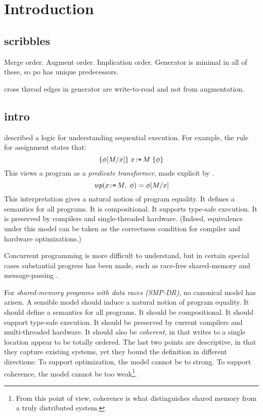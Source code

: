 
\section{Introduction}

\subsection{scribbles}
Merge order.
Augment order.
Implication order.
Generator is minimal in all of these, so po has unique predecessors.

cross thread edges in generator are write-to-read and not from augmentation.

\subsection{intro}

\citet{Hoare:1969:ABC:363235.363259} described a logic for understanding
sequential execution.  For example, the rule for assignment states that:
\begin{displaymath}
  \{\phi[M/x]\}\;x\texttt{:}\mkern-1mu\texttt{=}\,M\;\{\phi\}
\end{displaymath}
This views a program as a \emph{predicate transformer}, made explicit by
\citet{Dijkstra:1975:GCN:360933.360975}.
\begin{displaymath}
  \textit{wp}(x\texttt{:}\mkern-1mu\texttt{=}\,M,\;\phi) = \phi[M/x]
\end{displaymath}
This interpretation gives a natural notion of program equality.  It defines a
semantics for all programs.  It is compositional.  It supports type-safe
execution.  It is preserved by compilers and single-threaded hardware.
(Indeed, equivalence under this model can be taken as the correctness
condition for compiler and hardware optimizations.)


Concurrent programming is more difficult to understand, but in certain
special cases substantial progress has been made, such as race-free
shared-memory
\citep{OHearn:2007:RCL:1235896.1236121,OHearn:2019:SL:3310134.3211968} and
message-passing \citep{Hennessy:1980:ONC:646234.758793,Cleaveland2018}.

For \emph{shared-memory programs with data races (SMP-DR)}, no canonical
model has arisen.  A sensible model should induce a natural notion of program
equality.  It should define a semantics for all programs.  It should be
compositional.  It should support type-safe execution.  It should be
preserved by current compilers and multi-threaded hardware.  It should also be
\emph{coherent}, in that writes to a single location appear to be totally
ordered.  The last two points are descriptive, in that they capture existing
systems, yet they bound the definition in different directions: To support
optimization, the model cannot be to strong.  To support coherence, the model
cannot be too weak\footnote{From this point of view, coherence is what
  distinguishes shared memory from a truly distributed system.}.

